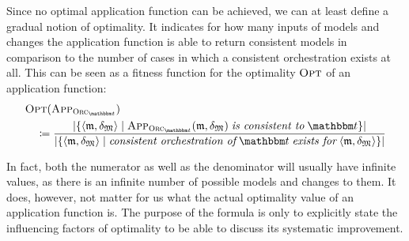 Since no optimal application function can be achieved, we can at least define a gradual notion of optimality.
It indicates for how many inputs of models and changes the application function is able to return consistent models in comparison to the number of cases in which a consistent orchestration exists at all.
This can be seen as a fitness function for the optimality $\textsc{Opt}$ of an application function:
\begin{align*}
    &
    \function{Opt}(\appfunction{\orcfunction{\transformationset{T}}}) \\
    & \formulaskip
    \equalsperdefinition 
    \frac{
        \abs{\setted{%
        \tupled{\modeltuple{m},\changetuple{\metamodeltuple{M}}} \mid \appfunction{\orcfunction{\transformationset{T}}}(\modeltuple{m}, \changetuple{\metamodeltuple{M}}) \mathtextspacearound{is consistent to} \transformationset{T}}}
    }{
        \abs{\setted{\tupled{\modeltuple{m},\changetuple{\metamodeltuple{M}}} \mid \mathtextspaceafter{consistent orchestration of} \transformationset{T} \mathtextspacearound{exists for} \tupled{\modeltuple{m}, \changetuple{\metamodeltuple{M}}}}}
    }
\end{align*}

In fact, both the numerator as well as the denominator will usually have infinite values, as there is an infinite number of possible models and changes to them.
It does, however, not matter for us what the actual optimality value of an application function is.
The purpose of the formula is only to explicitly state the influencing factors of optimality to be able to discuss its systematic improvement.

